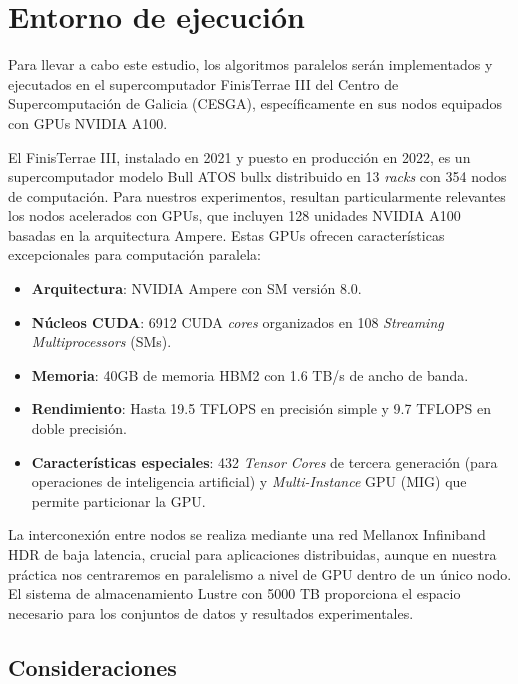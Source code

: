 \chapter{Entorno de ejecución}

Para llevar a cabo este estudio, los algoritmos paralelos serán implementados y ejecutados en el supercomputador FinisTerrae III del Centro de Supercomputación de Galicia (CESGA), específicamente en sus nodos equipados con GPUs NVIDIA A100.

El FinisTerrae III, instalado en 2021 y puesto en producción en 2022, es un supercomputador modelo Bull ATOS bullx distribuido en 13 \textit{racks} con 354 nodos de computación. Para nuestros experimentos, resultan particularmente relevantes los nodos acelerados con GPUs, que incluyen 128 unidades NVIDIA A100 basadas en la arquitectura Ampere. Estas GPUs ofrecen características excepcionales para computación paralela:

\begin{itemize}
    \item \textbf{Arquitectura}: NVIDIA Ampere con SM versión 8.0.
    \item \textbf{Núcleos CUDA}: 6912 CUDA \textit{cores} organizados en 108 \textit{Streaming Multiprocessors} (SMs).
    \item \textbf{Memoria}: 40GB de memoria HBM2 con 1.6 TB/s de ancho de banda.
    \item \textbf{Rendimiento}: Hasta 19.5 TFLOPS en precisión simple y 9.7 TFLOPS en doble precisión.
    \item \textbf{Características especiales}: 432 \textit{Tensor Cores} de tercera generación (para operaciones de inteligencia artificial) y \textit{Multi-Instance} GPU (MIG) que permite particionar la GPU.
\end{itemize}

La interconexión entre nodos se realiza mediante una red Mellanox Infiniband HDR de baja latencia, crucial para aplicaciones distribuidas, aunque en nuestra práctica nos centraremos en paralelismo a nivel de GPU dentro de un único nodo. El sistema de almacenamiento Lustre con 5000 TB proporciona el espacio necesario para los conjuntos de datos y resultados experimentales.

\newpage

\section{Consideraciones}
	
